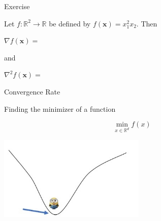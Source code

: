 \documentclass{beamer}
\def\reals{\mathbb{R}}
\begin{document}
\begin{frame}{Exercise}

\Large 
Let $f : \reals^2 \to \reals $ be defined by $f(\mathbf{x}) = x_1^2 x_2$. Then
\begin{block}{}
 $   \nabla f(\mathbf{x}) = $
\hfill \break
\end{block}
and 
\begin{alertblock}{}
 $   \nabla^2 f(\mathbf{x}) = $
\hfill \break
\hfill \break
\end{alertblock}



\end{frame}


\begin{frame}

\Large 

Convergence Rate

\end{frame}

\begin{frame}{}

\Large

Finding the minimizer of a function 

\begin{equation}
\min_{x \in \reals^d} f(x)
\end{equation}


{
\centering
 \includegraphics[width=7cm]{minimal.jpg}
}


\end{frame}
\end{document}
